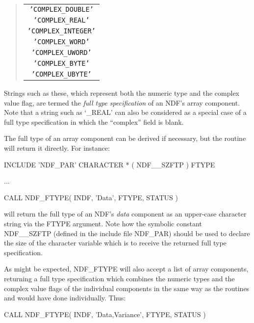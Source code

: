 \documentclass[twoside,11pt,nolof]{starlink}
\providecommand{\st}[1]{{\emph{#1}}}
\providecommand{\hi}[1]{{\texttt{#1}}}
\begin{document}
\small
\begin{quote}
\begin{center}
\begin{tabular}{c}
\hi{'COMPLEX\_DOUBLE'}\\
\hi{'COMPLEX\_REAL'}\\
\hi{'COMPLEX\_INTEGER'}\\
\hi{'COMPLEX\_WORD'}\\
\hi{'COMPLEX\_UWORD'}\\
\hi{'COMPLEX\_BYTE'}\\
\hi{'COMPLEX\_UBYTE'}
\end{tabular}
\end{center}
\end{quote}
\normalsize

Strings such as these, which represent both the numeric type and the complex
value flag, are termed the \st{full type specification\/} of an NDF's array
component.
Note that a string such as `\_REAL' can also be considered as a special case
of a full type specification in which the ``complex'' field is blank.

The full type of an array component can be derived if necessary, but the
routine  will return it directly.
For instance:

\small
\begin{terminalv}
      INCLUDE 'NDF_PAR'
      CHARACTER * ( NDF__SZFTP ) FTYPE

      ...

      CALL NDF_FTYPE( INDF, 'Data', FTYPE, STATUS )
\end{terminalv}
\normalsize

will return the full type of an NDF's \st{data\/} component as an upper-case
character string via the FTYPE argument.
Note how the symbolic constant NDF\_\_SZFTP (defined in the include file
NDF\_PAR) should be used to declare the size of the character variable which
is to receive the returned full type specification.

As might be expected, NDF\_FTYPE will also accept a list of array
components, returning a full type specification which combines the numeric
types and the complex value flags of the individual components in the same
way as the routines  and  would have done individually.
Thus:

\small
\begin{terminalv}
      CALL NDF_FTYPE( INDF, 'Data,Variance', FTYPE, STATUS )
\end{terminalv}
\normalsize
\end{document}
